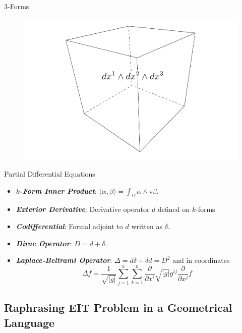 \documentclass[aspectratio=169]{beamer}
\newcommand\boldgreen[1]{\textcolor{lighter_csu_green}{\emph{\textbf{#1}}}}
\begin{document}
\begin{frame}{3-Forms}
\vfill
\begin{figure}[H]
    \centering
	\includegraphics[width=.8\columnwidth]{3forms.png}
\end{figure}
\vfill
\end{frame}




\begin{frame}{Partial Differential Equations}
    \vfill
    \pause
    \begin{itemize} 
    \item \boldgreen{$k$-Form Inner Product}: $\displaystyle{\langle\alpha,\beta\rangle = \int_\Omega \alpha \wedge \star \beta}$.
    \pause
    
        \item \boldgreen{Exterior Derivative}: Derivative operator $d$ defined on $k$-forms.  
        
        \pause 
        \item \boldgreen{Codifferential}: Formal adjoint to $d$ written as $\delta$.
        
        \pause
        \item \boldgreen{Dirac Operator}: $D=d+\delta$.
        
        \pause
        \item \boldgreen{Laplace-Beltrami Operator}: $\Delta = d\delta +\delta d=D^2$ and in coordinates
        \[
        \Delta f = \frac{1}{\sqrt{|g|}} \sum_{j=1}^n \sum_{k=1}^n \frac{\partial}{\partial x^i} \sqrt{|g|} g^{ij} \frac{\partial}{\partial x^j} f 
        \]
    \end{itemize}
\end{frame}

\subsection{Raphrasing EIT Problem in a Geometrical Language}
\end{document}
